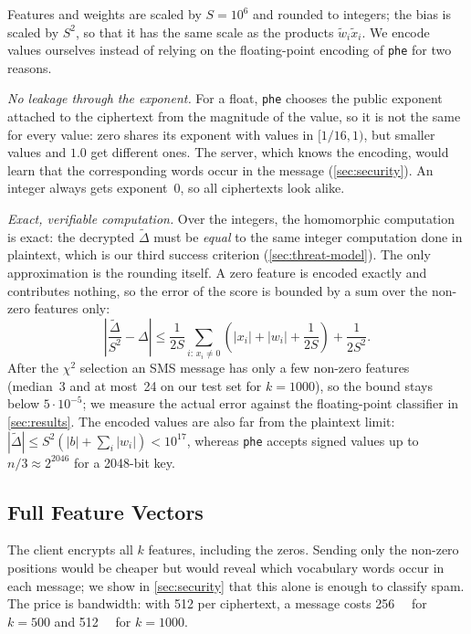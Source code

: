 Features and weights are scaled by $S = 10^{6}$ and rounded to integers; the bias is scaled by $S^2$, so that it has the same scale as the products $\tilde{w}_i \tilde{x}_i$.
We encode values ourselves instead of relying on the floating-point encoding of \texttt{phe} for two reasons.

\textit{No leakage through the exponent.}
For a float, \texttt{phe} chooses the public exponent attached to the ciphertext from the magnitude of the value, so it is not the same for every value: zero shares its exponent with values in $[1/16, 1)$, but smaller values and $1.0$ get different ones.
The server, which knows the encoding, would learn that the corresponding words occur in the message (\cref{sec:security}).
An integer always gets exponent~0, so all ciphertexts look alike.

\textit{Exact, verifiable computation.}
Over the integers, the homomorphic computation is exact: the decrypted $\tilde{\Delta}$ must be \emph{equal} to the same integer computation done in plaintext, which is our third success criterion (\cref{sec:threat-model}).
The only approximation is the rounding itself.
A zero feature is encoded exactly and contributes nothing, so the error of the score is bounded by a sum over the non-zero features only:
\begin{equation}
  \left| \frac{\tilde{\Delta}}{S^2} - \Delta \right| \le \frac{1}{2S} \sum_{i:\, x_i \ne 0} \left( |x_i| + |w_i| + \frac{1}{2S} \right) + \frac{1}{2S^2}.
\end{equation}
After the $\chi^2$ selection an SMS message has only a few non-zero features (median~3 and at most~24 on our test set for $k = 1000$), so the bound stays below $5 \cdot 10^{-5}$; we measure the actual error against the floating-point classifier in \cref{sec:results}.
The encoded values are also far from the plaintext limit: $|\tilde{\Delta}| \le S^2 (|b| + \sum_i |w_i|) < 10^{17}$, whereas \texttt{phe} accepts signed values up to $n/3 \approx 2^{2046}$ for a \num{2048}-bit key.

\subsection{Full Feature Vectors}

The client encrypts all $k$ features, including the zeros.
Sending only the non-zero positions would be cheaper but would reveal which vocabulary words occur in each message; we show in \cref{sec:security} that this alone is enough to classify spam.
The price is bandwidth: with \SI{512}{\byte} per ciphertext, a message costs \SI{256}{\kilo\byte} for $k = 500$ and \SI{512}{\kilo\byte} for $k = 1000$.

